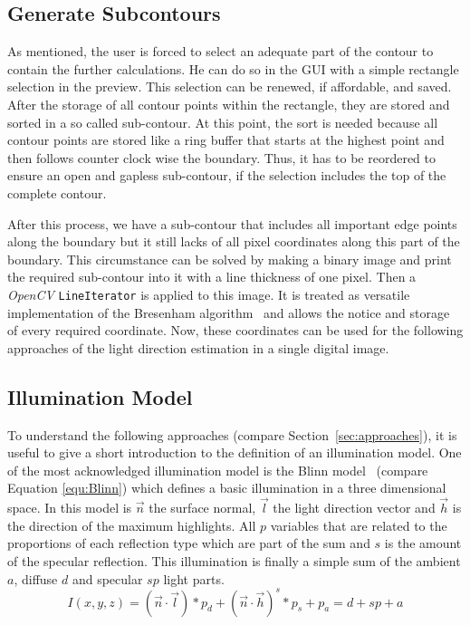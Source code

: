 \subsection{Generate Subcontours}\label{sec:subcontours}
As mentioned, the user is forced to select an adequate part of the contour to contain the further calculations. He can do so in the GUI with a simple rectangle selection in the preview. This selection can be renewed, if affordable, and saved. After the storage of all contour points within the rectangle, they are stored and sorted in a so called  sub-contour. At this point, the sort is needed because all contour points are stored like a ring buffer that starts at the highest point and then follows counter clock wise the boundary. Thus, it has to be reordered to ensure an open and gapless sub-contour, if the selection includes the top of the complete contour.

After this process, we have a sub-contour that includes all important edge points along the boundary but it still lacks of all pixel coordinates along this part of the boundary.
This circumstance can be solved by making a binary image and print the required sub-contour into it with a line thickness of one pixel. Then a \textit{OpenCV} \texttt{LineIterator} is applied to this image. It is treated as versatile implementation of the Bresenham algorithm~\cite{5388473} and allows the notice and storage of every required coordinate. Now, these coordinates can be used for the following approaches of the light direction estimation in a single digital image.


\subsection{Illumination Model}\label{sec:lightingmodel}
To understand the following approaches (compare Section~\ref{sec:approaches}), it is useful to give a short introduction to the definition of an illumination model. One of the most acknowledged illumination model is the Blinn model~\cite{Blinn:1977} (compare Equation \ref{equ:Blinn}) which defines a basic illumination in a three dimensional space. In this model is $\vec{n}$ the surface normal, $\vec{l}$ the light direction vector and $\vec{h}$ is the direction of the maximum highlights. All $p$ variables that are related to the proportions of each reflection type which are part of the sum and $s$ is the amount of the specular reflection. This illumination is finally a simple sum of the ambient $a$, diffuse $d$ and specular $sp$ light parts. 
\begin{equation}
\label{equ:Blinn}
I(x,y,z) = (\vec{n}\cdot \vec{l})*p_d + (\vec{n}\cdot\vec{h})^s*p_s + p_a = d + sp + a
\end{equation} 

